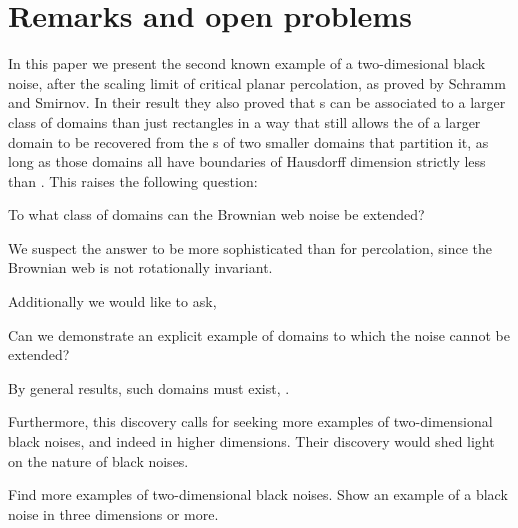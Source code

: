 {
\section{Remarks and open problems}

\label{sec:open-problems}

In this paper we present the second known example of a two-dimesional
black noise, after the scaling limit of critical planar percolation,
as proved by Schramm and Smirnov.  In their result they also proved
that \sigfield{}s can be associated to a larger class of domains than
just rectangles in a way that still allows the \sigfield{} of a larger
domain to be recovered from the \sigfield{}s of two smaller domains
that partition it, as long as those domains all have boundaries of
Hausdorff dimension strictly less than .  This raises the following question:

\begin{openproblem}
  To what class of domains can the Brownian web noise be extended?
\end{openproblem}

We suspect the answer to be more sophisticated than for percolation,
since the Brownian web is not rotationally invariant.  

Additionally we would like to ask,

\begin{openproblem}
  Can we demonstrate an explicit example of domains to which the noise
  cannot be extended?
\end{openproblem}

By general results, such domains must exist, .

Furthermore, this discovery calls for seeking more examples of
two-dimensional black noises, and indeed in higher dimensions.  Their
discovery would shed light on the nature of black noises.

\begin{openproblem}
  Find more examples of two-dimensional black noises.  Show an example
  of a black noise in three dimensions or more.
\end{openproblem}
}
